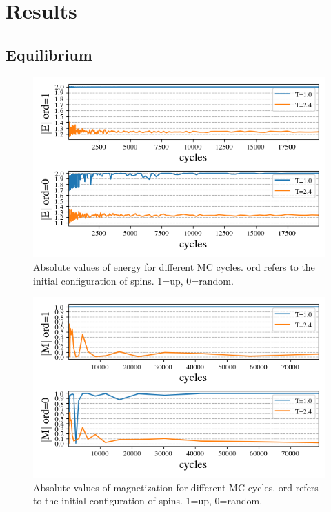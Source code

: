 \section{Results}



\subsection{Equilibrium}



\begin{figure}[H]
  \centering
  \includegraphics[width=\textwidth]{../figures/equilibrium_E.png}
  \caption{Absolute values of energy for different MC cycles.
  ord refers to the initial configuration of spins. 1=up, 0=random.}
  \label{fig:equi_E}
\end{figure}


\begin{figure}[H]
  \centering
  \includegraphics[width=\textwidth]{../figures/equilibrium_M.png}
  \caption{Absolute values of magnetization for different MC cycles.
  ord refers to the initial configuration of spins. 1=up, 0=random.}
  \label{fig:equi_M}
\end{figure}


